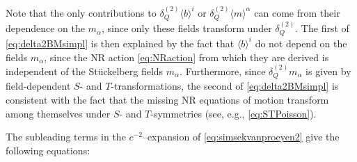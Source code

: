 \documentclass[a4paper,10pt,openany]{article}
\begin{document}
	Note that the only contributions to $\delta_Q^{(2)} \langle b\rangle^i$ or $\delta_Q^{(2)} \langle m\rangle^\alpha$ can come from their dependence on the $m_\alpha$, since only these fields transform under $\delta_Q^{(2)}$. The first of \eqref{eq:delta2BMsimpl} is then explained by the fact that $\langle b \rangle^i$ do not depend on the fields $m_\alpha$, since the NR action \eqref{eq:NRaction} from which they are derived is independent of the St\"uckelberg fields $m_\alpha$. Furthermore, since $\delta_Q^{(2)} m_\alpha$ is given by field-dependent $S$- and $T$-transformations, the second of \eqref{eq:delta2BMsimpl} is consistent with the fact that the missing NR equations of motion transform among themselves under $S$- and $T$-symmetries (see, e.g., \eqref{eq:STPoisson}).
	
	The subleading terms in the $c^{-2}$--expansion of \eqref{eq:simsekvanproeyen2} give the following equations:
\end{document}
